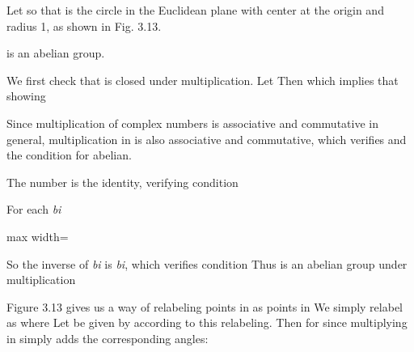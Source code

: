 \documentclass[11pt,oneside]{article}
\begin{document}
\BookNarrativetrue

\begin{BookBody}


\noindent Let  so that  is the circle in the Euclidean plane with center at the origin and radius 1, as shown in Fig. 3.13.

  is an abelian group.

 We first check that  is closed under multiplication. Let  Then  which implies that  showing 

Since multiplication of complex numbers is associative and commutative in general, multiplication in  is also associative and commutative, which verifies  and the condition for abelian.

The number  is the identity, verifying condition 

For each  \textit{bi} 

\begin{center}\begin{adjustbox}{max width=\linewidth}\end{adjustbox}\end{center}

\noindent So the inverse of  \textit{bi} is  \textit{bi}, which verifies condition  Thus  is an abelian group under multiplication\BookEnd{\blacklozenge}

Figure 3.13 gives us a way of relabeling points in  as points in  We simply relabel  as \BookInline{\theta } where  Let  be given by  according to this relabeling. Then for  since multiplying in  simply adds the corresponding angles:


\end{BookBody}
\end{document}
